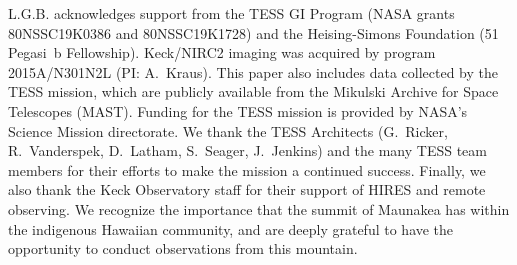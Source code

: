 \documentclass[12pt,twocolumn,linenumbers]{aastex63}
\begin{document}
\acknowledgements
\raggedbottom
%
L.G.B{.} acknowledges support from the TESS GI Program (NASA grants
80NSSC19K0386 and 80NSSC19K1728) and the Heising-Simons Foundation (51 Pegasi~b
Fellowship).
%
%
Keck/NIRC2 imaging was acquired by program 2015A/N301N2L
(PI: A.~Kraus). %
%
%
This paper also includes data collected by the TESS mission, which are
publicly available from the Mikulski Archive for Space Telescopes
(MAST).
%
Funding for the TESS mission is provided by NASA's Science Mission
directorate.
%
We thank the TESS Architects (G.~Ricker, R.~Vanderspek, D.~Latham,
S.~Seager, J.~Jenkins) and the many TESS team members for their
efforts to make the mission a continued success.
%
%
%
%
Finally, we also thank the Keck Observatory staff for their support of
HIRES and remote observing.  We recognize the importance that the
summit of Maunakea has within the indigenous Hawaiian community, and
are deeply grateful to have the opportunity to conduct observations
from this mountain.
%
%


%
\end{document}

